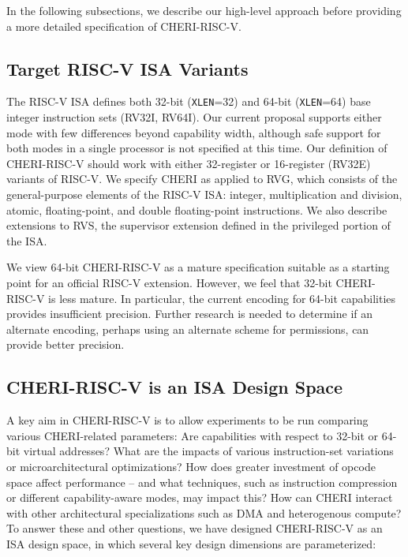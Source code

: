 In the following subsections, we describe our high-level approach before
providing a more detailed specification of CHERI-RISC-V.

\subsection{Target RISC-V ISA Variants}

The RISC-V ISA defines both 32-bit (\texttt{XLEN}=32) and 64-bit
(\texttt{XLEN}=64) base integer instruction
sets (RV32I, RV64I). 
Our current proposal supports either mode with few differences beyond
capability width, although safe support for both modes in a single processor
is not specified at this time.
Our definition of CHERI-RISC-V should work with either 32-register or
16-register (RV32E) variants of RISC-V.
We specify CHERI as applied to RVG, which consists of the general-purpose
elements of the RISC-V ISA: integer, multiplication and division,
atomic, floating-point, and double floating-point instructions.
We also describe extensions to RVS, the supervisor extension defined in the
privileged portion of the ISA.

We view 64-bit CHERI-RISC-V as a mature specification suitable as a
starting point for an official RISC-V extension.  However, we feel
that 32-bit CHERI-RISC-V is less mature.  In particular, the current
encoding for 64-bit capabilities provides insufficient precision.
Further research is needed to determine if an alternate encoding,
perhaps using an alternate scheme for permissions, can provide better
precision.

\subsection{CHERI-RISC-V is an ISA Design Space}

A key aim in CHERI-RISC-V is to allow experiments to be run comparing various
CHERI-related parameters:  Are capabilities with respect to 32-bit or
64-bit virtual addresses?  What are the impacts of various instruction-set
variations or microarchitectural optimizations?  How does greater investment
of opcode space affect performance -- and what techniques, such as instruction
compression or different capability-aware modes, may impact this?  How can
CHERI interact with other architectural specializations such as DMA and
heterogenous compute?
To answer these and other questions, we have designed CHERI-RISC-V as an ISA
design space, in which several key design dimensions are parameterized:

